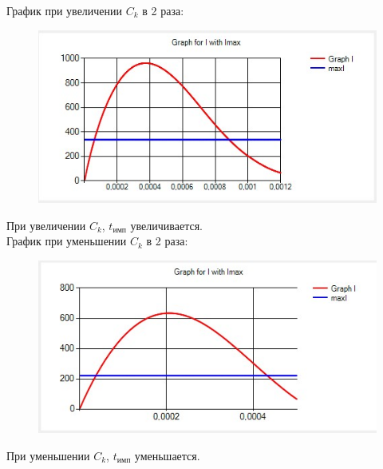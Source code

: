 \documentclass[14pt, a4paper]{extarticle}
\begin{document}
\begin{enumerate}
	График при увеличении $C_k$ в 2 раза:
	\begin{figure}[h]
		\centering
		\includegraphics[scale=1]{source/test4.2.jpg}
	\end{figure}\par
	При увеличении $C_k$, $t_{\text{имп}}$ увеличивается.\\
	\newpage
	График при уменьшении $C_k$ в 2 раза:
	\begin{figure}[h]
		\centering
		\includegraphics[scale=1]{source/test4.3.jpg}
	\end{figure}\par
	При уменьшении $C_k$, $t_{\text{имп}}$ уменьшается.\\
	

\end{enumerate}
\end{document}
